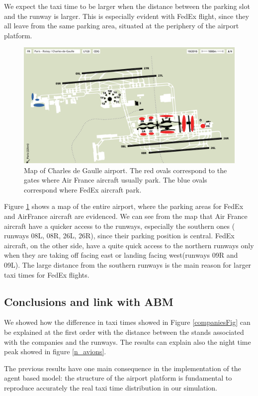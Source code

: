 \documentclass{article}
\begin{document}
We expect the taxi time to be larger when the distance between the parking slot and the runway is larger. This is especially evident with FedEx flight, since they all leave from the same parking area, situated at the periphery of the airport platform.

\begin{figure}[h]
	\centering
	\includegraphics[width=\textwidth]{map_airport_filled}
	\caption{Map of Charles de Gaulle airport. The red ovals correspond to the gates where Air France aircraft usually park. The blue ovals correspond where FedEx aircraft park.}
	\label{map}
\end{figure}

Figure \ref{map} shows a map of the entire airport, where the parking areas for FedEx and AirFrance aircraft are evidenced.
We can see from the map that Air France aircraft have a quicker access to the runways, especially the southern ones ( runways 08L, 08R, 26L, 26R), since their parking position is central. FedEx aircraft, on the other side, have a quite quick access to the northern runways only when they are taking off facing east or landing facing west(runways 09R and 09L). The large distance from the southern runways is the main reason for larger taxi times for FedEx flights.


\subsection{Conclusions and link with ABM}
We showed how the difference in taxi times showed in Figure \ref{companiesFig} can be explained at the first order with the distance between the stands associated with the companies and the runways. The results can explain also the night time peak showed in figure \ref{n_avions}.

The previous results have one main consequence in the implementation of the agent based model: the structure of the airport platform is fundamental to reproduce accurately the real taxi time distribution in our simulation.
\end{document}
